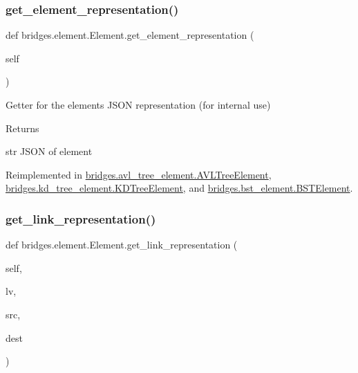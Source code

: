 \subsubsection{\texorpdfstring{get\_element\_representation()}{get\_element\_representation()}}
{\footnotesize\ttfamily def bridges.\+element.\+Element.\+get\+\_\+element\+\_\+representation (\begin{DoxyParamCaption}\item[{}]{self }\end{DoxyParamCaption})}



Getter for the element\textquotesingle{}s J\+S\+ON representation (for internal use) 

\begin{DoxyReturn}{Returns}


str J\+S\+ON of element 
\end{DoxyReturn}


Reimplemented in \mbox{\hyperlink{classbridges_1_1avl__tree__element_1_1_a_v_l_tree_element_abf8842cb462f1e31f0889d67fb0d70d4}{bridges.\+avl\+\_\+tree\+\_\+element.\+A\+V\+L\+Tree\+Element}}, \mbox{\hyperlink{classbridges_1_1kd__tree__element_1_1_k_d_tree_element_a4e08a6f2e4ff70be2b0dfd6eacdcf10e}{bridges.\+kd\+\_\+tree\+\_\+element.\+K\+D\+Tree\+Element}}, and \mbox{\hyperlink{classbridges_1_1bst__element_1_1_b_s_t_element_a9d038f191a7cf06e75910463a3aa3b80}{bridges.\+bst\+\_\+element.\+B\+S\+T\+Element}}.

\mbox{\label{classbridges_1_1element_1_1_element_a8f220d7b81c0e0dd84b9eff33ade76b9}} 
\subsubsection{\texorpdfstring{get\_link\_representation()}{get\_link\_representation()}}
{\footnotesize\ttfamily def bridges.\+element.\+Element.\+get\+\_\+link\+\_\+representation (\begin{DoxyParamCaption}\item[{}]{self,  }\item[{}]{lv,  }\item[{}]{src,  }\item[{}]{dest }\end{DoxyParamCaption})}



